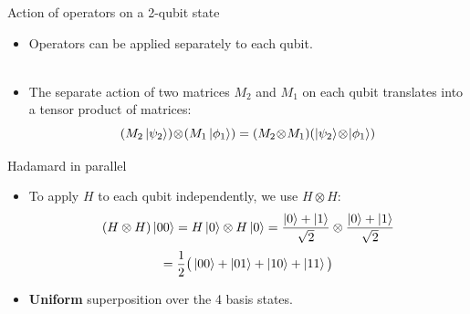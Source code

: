 \documentclass[aspectratio=169,12pt]{beamer}
\begin{document}
\begin{frame}{Action of operators on a 2-qubit state}
  \begin{itemize}[<+->]
    \item Operators can be applied separately to each qubit.
    \\~\\
    \item The separate action of two matrices $M_2$ and $M_1$ on each qubit translates into a tensor product of matrices:
    \[
      (M_2\ket{\psi_2})\!\otimes\!(M_1\ket{\phi_1}) = (M_2\!\otimes\! M_1)(\ket{\psi_2}\!\otimes\!\ket{\phi_1})
    \]
  \end{itemize}
\end{frame}

\begin{frame}{Hadamard in parallel}
  \begin{itemize}[<+->]
    \setlength{\itemsep}{0.55em}
    \item To apply $H$ to each qubit independently, we use $H\otimes H$:
    $$(H\otimes H)\ket{00} = H\ket{0}\otimes H\ket{0}
     = \frac{\ket{0}+\ket{1}}{\sqrt{2}}\otimes\frac{\ket{0}+\ket{1}}{\sqrt{2}}$$
    $$= \frac{1}{2}\big(\ket{00}+\ket{01}+\ket{10}+\ket{11}\big)$$
    \item \textbf{Uniform} superposition over the 4 basis states.
  \end{itemize}
\end{frame}
\end{document}
